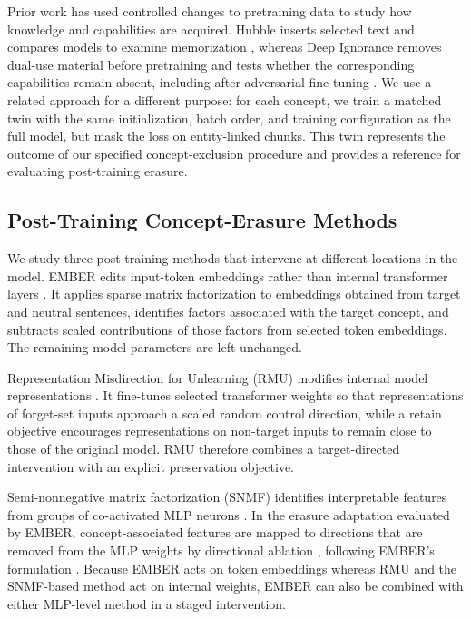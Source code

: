 Prior work has used controlled changes to pretraining data to study how
knowledge and capabilities are acquired. Hubble inserts selected text and
compares models to examine memorization \citep{wei2025hubble}, whereas Deep
Ignorance removes dual-use material before pretraining and tests whether the
corresponding capabilities remain absent, including after adversarial
fine-tuning \citep{obrien2025deepignorance}. We use a related approach for a
different purpose: for each concept, we train a matched twin with the same
initialization, batch order, and training configuration as the full model, but
mask the loss on entity-linked chunks. This twin represents the outcome of our
specified concept-exclusion procedure and provides a reference for evaluating
post-training erasure.

\subsection{Post-Training Concept-Erasure Methods}

We study three post-training methods that intervene at different locations in
the model. EMBER edits input-token embeddings rather than internal transformer
layers \citep{suslik2026ember}. It applies sparse matrix factorization to
embeddings obtained from target and neutral sentences, identifies factors
associated with the target concept, and subtracts scaled contributions of
those factors from selected token embeddings. The remaining model parameters
are left unchanged.

Representation Misdirection for Unlearning (RMU) modifies internal model
representations \citep{li2024wmdp}. It fine-tunes selected transformer weights
so that representations of forget-set inputs approach a scaled random control
direction, while a retain objective encourages representations on non-target
inputs to remain close to those of the original model. RMU therefore combines
a target-directed intervention with an explicit preservation objective.

Semi-nonnegative matrix factorization (SNMF) identifies interpretable features
from groups of co-activated MLP neurons \citep{shafran2026snmf}. In the
erasure adaptation evaluated by EMBER, concept-associated features are mapped
to directions that are removed from the MLP weights by directional ablation
\citep{arditi2024refusal}, following EMBER's formulation
\citep{suslik2026ember}. Because EMBER acts on token embeddings whereas RMU
and the SNMF-based method act on internal weights, EMBER can also be combined
with either MLP-level method in a staged intervention.

